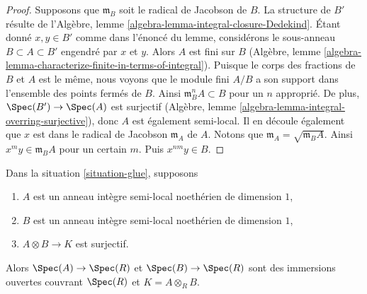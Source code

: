 \begin{proof}
Supposons que $\mathfrak m_B$ soit le radical de Jacobson
de $B$. La structure de $B'$ résulte de l'Algèbre, lemme
\ref{algebra-lemma-integral-closure-Dedekind}. Étant
donné $x, y \in B'$ comme dans l'énoncé du lemme,
considérons le sous-anneau $B \subset A \subset B'$
engendré par $x$ et $y$. Alors $A$ est fini sur $B$
(Algèbre, lemme
\ref{algebra-lemma-characterize-finite-in-terms-of-integral}).
Puisque le corps des fractions de $B$ et $A$ est le même, nous
voyons que le module fini $A/B$ a son support dans l'ensemble des
points fermés de $B$. Ainsi $\mathfrak m_B^n A \subset B$ pour
un $n$ approprié. De plus, $\Spec(B') \to \Spec(A)$ est
surjectif (Algèbre, lemme
\ref{algebra-lemma-integral-overring-surjective}), donc $A$ est également
semi-local. Il en découle également que $x$ est dans le radical de Jacobson
$\mathfrak m_A$ de $A$. Notons que $\mathfrak m_A = \sqrt{\mathfrak m_B A}$.
Ainsi $x^m y \in \mathfrak m_B A$ pour un certain $m$. Puis $x^{nm} y \in B$.
\end{proof}

\begin{lemma}
\label{lemma-semi-local-both-side}
Dans la situation \ref{situation-glue}, supposons
\begin{enumerate}
\item $A$ est un anneau intègre semi-local noethérien de
dimension $1$, \item $B$ est un anneau intègre semi-local
noethérien de dimension $1$, \item $A \otimes B \to K$ est surjectif.
\end{enumerate}
Alors $\Spec(A) \to \Spec(R)$ et $\Spec(B) \to \Spec(R)$ sont des
immersions ouvertes couvrant $\Spec(R)$ et $K = A \otimes_R B$.
\end{lemma}

